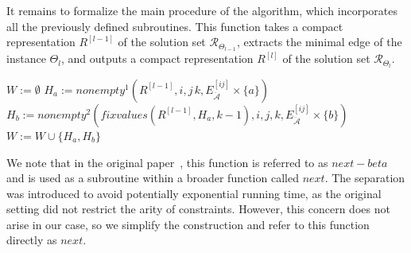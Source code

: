 \documentclass{article}
\theoremstyle{definition}
\theoremstyle{theorem}
\theoremstyle{theorem}
\theoremstyle{remark}
\theoremstyle{remark}
\theoremstyle{example}
\theoremstyle{notation}
\theoremstyle{theorem}
\begin{document}
It remains to formalize the main procedure of the algorithm, which incorporates all the previously defined subroutines. This function takes a compact representation $R^{[l-1]}$ of the solution set $\mathscr{R}_{\Theta_{l-1}}$, extracts the minimal edge of the instance $\Theta_l$, and outputs a compact representation $R^{[l]}$ of the solution set $\mathscr{R}_{\Theta_l}$.

\begin{algorithm}[H]
\caption{: $next(R^{[l-1]}, \langle i,j\rangle, E^{[\langle i,j\rangle]}_{\ddot{\mathcal{A}}})$}\label{alg:cap}
\begin{algorithmic}[1] 
\State $W:=\emptyset$
  \State $H_a:=nonempty^1(R^{[l-1]},  i,j\,k, E^{[ij]}_{\ddot{\mathcal{A}}}\times\{a\})$
       \State $H_b:=nonempty^2(fixvalues(R^{[l-1]},H_a, k-1),  i,j,k, E^{[ij]}_{\ddot{\mathcal{A}}}\times\{b\})$
          \State $W:=W\cup\{H_a,H_b\} $      
       \EndIf{}
  \EndIf{}  
\EndFor \\

\end{algorithmic}
\end{algorithm}

We note that in the original paper~\cite{doi:10.1137/050628957}, this function is referred to as $next-beta$ and is used as a subroutine within a broader function called $next$. The separation was introduced to avoid potentially exponential running time, as the original setting did not restrict the arity of constraints. However, this concern does not arise in our case, so we simplify the construction and refer to this function directly as $next$.
\end{document}
